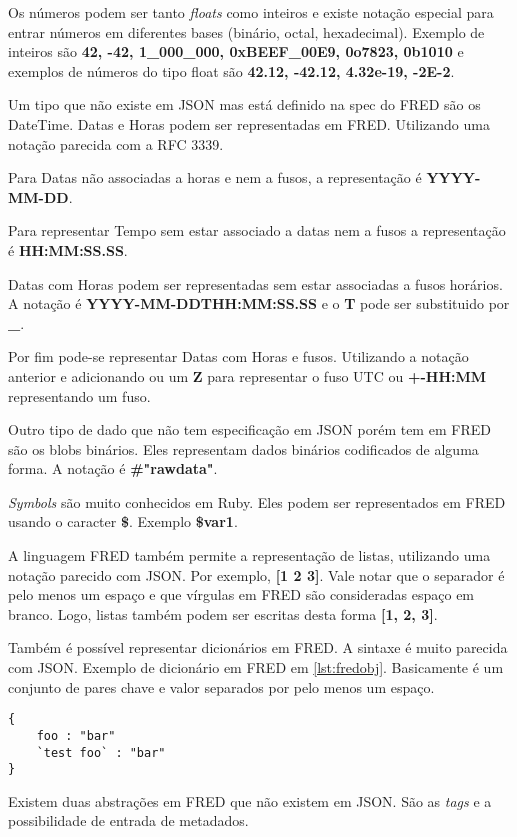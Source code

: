 Os números podem ser tanto \textit{floats} como inteiros e existe notação especial para
entrar números em diferentes bases (binário, octal, hexadecimal). Exemplo de inteiros 
são \textbf{42, -42, 1\_000\_000, 0xBEEF\_00E9, 0o7823, 0b1010} e exemplos de números do tipo
float são \textbf{42.12, -42.12, 4.32e-19, -2E-2}.

Um tipo que não existe em JSON mas está definido na spec do FRED são os DateTime.
Datas e Horas podem ser representadas em FRED. Utilizando uma notação parecida com
a RFC 3339.

Para Datas não associadas a horas e nem a fusos, a representação é \textbf{YYYY-MM-DD}.

Para representar Tempo sem estar associado a datas nem a fusos a representação é \textbf{HH:MM:SS.SS}.

Datas com Horas podem ser representadas sem estar associadas a fusos horários. 
A notação é \textbf{YYYY-MM-DDTHH:MM:SS.SS} e o \textbf{T} pode ser substituido por \textbf{\_}.

Por fim pode-se representar Datas com Horas e fusos. Utilizando a notação anterior e adicionando
ou um \textbf{Z} para representar o fuso UTC ou \textbf{+-HH:MM} representando um fuso.

Outro tipo de dado que não tem especificação em JSON porém tem em FRED são os blobs binários. Eles
representam dados binários codificados de alguma forma. A notação é \textbf{\#"rawdata"}.

\textit{Symbols} são muito conhecidos em Ruby. Eles podem ser representados em FRED usando o caracter
\textbf{\$}. Exemplo \textbf{\$var1}.

A linguagem FRED também permite a representação de listas, utilizando uma notação parecido com JSON.
Por exemplo, \textbf{[1 2 3]}. Vale notar que o separador é pelo menos um espaço e que vírgulas em FRED
são consideradas espaço em branco. Logo, listas também podem ser escritas desta forma \textbf{[1, 2, 3]}.

Também é possível representar dicionários em FRED. A sintaxe é muito parecida com JSON. 
Exemplo de dicionário em FRED em \ref{lst:fredobj}. Basicamente é um conjunto de pares 
chave e valor separados por pelo menos um espaço.

\begin{lstlisting}[caption=Exemplo de dicionário em FRED,label={lst:fredobj}]
{
    foo : "bar"
    `test foo` : "bar"
}
\end{lstlisting}

Existem duas abstrações em FRED que não existem em JSON. São as \textit{tags} e a possibilidade de entrada 
de metadados.

